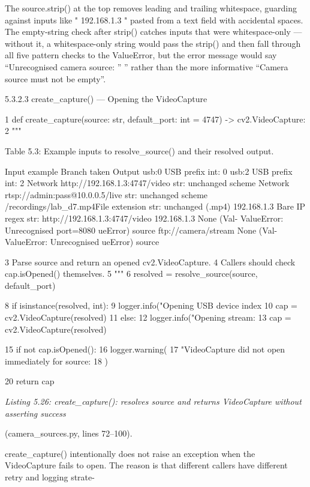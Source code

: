 The source.strip() at the top removes leading and trailing whitespace, guarding
against inputs like " 192.168.1.3 " pasted from a text ﬁeld with accidental spaces. The
empty-string check after strip() catches inputs that were whitespace-only --- without it,
a whitespace-only string would pass the strip() and then fall through all ﬁve pattern
checks to the ValueError, but the error message would say ``Unrecognised camera source:
'' '' rather than the more informative ``Camera source must not be empty''.


5.3.2.3 create\_capture() --- Opening the VideoCapture

1 def create\_capture(source: str, default\_port: int = 4747) -> cv2.VideoCapture:
2 """




Table 5.3: Example inputs to resolve\_source() and their resolved output.

Input example Branch taken Output
usb:0 USB preﬁx int: 0
usb:2 USB preﬁx int: 2
Network
http://192.168.1.3:4747/video str: unchanged
scheme
Network
rtsp://admin:pass@10.0.0.5/live str: unchanged
scheme
/recordings/lab\_d7.mp4File extension str: unchanged
(.mp4)
192.168.1.3 Bare IP regex str:
http://192.168.1.3:4747/video
192.168.1.3 None (Val- ValueError: Unrecognised
port=8080 ueError) source
ftp://camera/stream None (Val- ValueError: Unrecognised
ueError) source


3 Parse source and return an opened cv2.VideoCapture.
4 Callers should check cap.isOpened() themselves.
5 """
6 resolved = resolve\_source(source, default\_port)

8 if isinstance(resolved, int):
9 logger.info("Opening USB device index %
10 cap = cv2.VideoCapture(resolved)
11 else:
12 logger.info("Opening stream: %
13 cap = cv2.VideoCapture(resolved)


15 if not cap.isOpened():
16 logger.warning(
17 "VideoCapture did not open immediately for source: %
18 )

20 return cap


\textit{Listing 5.26: create\_capture(): resolves source and returns VideoCapture without asserting success}

(camera\_sources.py, lines 72--100).


create\_capture() intentionally does not raise an exception when the VideoCapture
fails to open. The reason is that different callers have different retry and logging strate-



